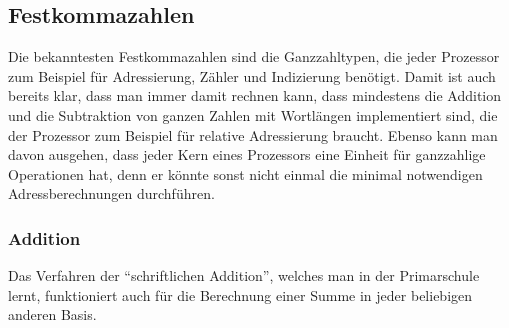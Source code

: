 %
%
\subsection{Festkommazahlen
\label{buch:subsection:integers}}
Die bekanntesten Festkommazahlen sind die Ganzzahltypen, die jeder
Prozessor zum Beispiel für Adressierung, Zähler und Indizierung
benötigt.
%
%
%
%
Damit ist auch bereits klar, dass man immer damit rechnen kann, dass
mindestens die Addition und die Subtraktion von ganzen Zahlen mit
Wortlängen implementiert sind, die der Prozessor zum Beispiel für
relative Adressierung braucht.
%
%
%
%
%
Ebenso kann man davon ausgehen, dass jeder Kern eines Prozessors
eine Einheit für ganzzahlige Operationen hat, denn er könnte sonst
nicht einmal die minimal notwendigen Adressberechnungen durchführen.

\subsubsection{Addition}
Das Verfahren der ``schriftlichen Addition'', welches man in der Primarschule
lernt, funktioniert auch für die Berechnung einer Summe in jeder beliebigen
anderen Basis.
%
%

